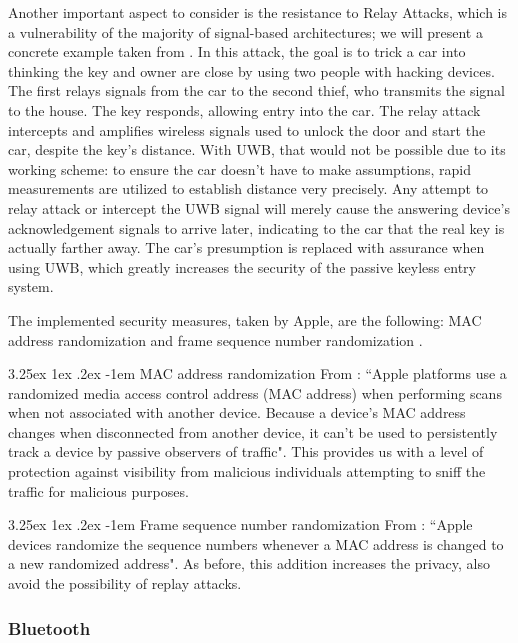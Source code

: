 \documentclass[english]{article}
\makeatletter
\renewcommand\paragraph{\@startsection{paragraph}{5}{\z@}%
  {3.25ex \@plus1ex \@minus.2ex}%
  {-1em}%
  {\normalfont\normalsize\bfseries}}
\makeatother
\begin{document}
Another important aspect to consider is the resistance to Relay Attacks, which is a vulnerability of the majority of signal-based architectures; we will present a concrete example taken from \cite{Global_2020}. In this attack, the goal is to trick a car into thinking the key and owner are close by using two people with hacking devices. The first relays signals from the car to the second thief, who transmits the signal to the house. The key responds, allowing entry into the car. The relay attack intercepts and amplifies wireless signals used to unlock the door and start the car, despite the key's distance. With UWB, that would not be possible due to its working scheme: to ensure the car doesn't have to make assumptions, rapid measurements are utilized to establish distance very precisely. Any attempt to relay attack or intercept the UWB signal will merely cause the answering device's acknowledgement signals to arrive later, indicating to the car that the real key is actually farther away. The car's presumption is replaced with assurance when using UWB, which greatly increases the security of the passive keyless entry system.

The implemented security measures, taken by Apple, are the following: MAC address randomization and frame sequence number randomization \cite{aps}.

\paragraph{MAC address randomization}
From \cite{aps}: ``Apple platforms use a randomized media access control address (MAC address) when performing scans when not associated with another device. Because a device’s MAC address changes when disconnected from another device, it can’t be used to persistently track a device by passive observers of traffic". This provides us with a level of protection against visibility from malicious individuals attempting to sniff the traffic for malicious purposes.

\paragraph{Frame sequence number randomization}
From \cite{aps}: ``Apple devices randomize the sequence numbers whenever a MAC address is changed to a new randomized address". As before, this addition increases the privacy, also avoid the possibility of replay attacks.


\subsubsection{Bluetooth}
\end{document}
